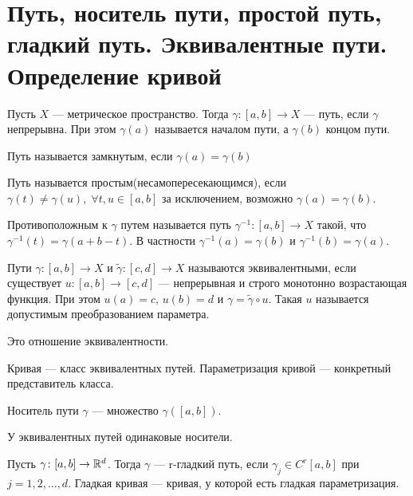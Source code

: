 \section{Путь, носитель пути, простой путь, гладкий путь. Эквивалентные пути. Определение кривой}

\begin{conj}
    Пусть $X$ --- метрическое пространство. Тогда
    $\gamma\colon [a, b] \to X$ --- путь, если $\gamma$ непрерывна. При этом $\gamma(a)$ называется началом пути, а $\gamma(b)$ концом пути.
  \end{conj}
  
  \begin{conj}
    Путь называется замкнутым, если $\gamma(a) = \gamma(b)$
  \end{conj}
  
  \begin{conj}
    Путь называется простым(несамопересекающимся), если  $\gamma(t) \neq \gamma(u),\; \forall t, u \in [a, b]$ за исключением, возможно $\gamma(a) = \gamma(b)$.
  \end{conj}
  
  \begin{conj}
    Противоположным к $\gamma$ путем называется путь $\gamma^{-1}\colon [a, b] \to X$ такой, что $\gamma^{-1}(t) = \gamma(a + b - t)$. В частности $\gamma^{-1}(a) = \gamma(b)$ и $\gamma^{-1}(b) = \gamma(a)$.
  \end{conj}
  
  \begin{conj}
    Пути $\gamma\colon[a, b] \to X$ и $\widetilde{\gamma}\colon[c, d] \to X$ называются эквивалентными, если существует $u\colon [a, b] \to [c, d]$ --- непрерывная и строго монотонно возрастающая функция. При этом $u(a) = c,\, u(b) = d$ и $\gamma = \widetilde{\gamma} \circ u$.
    Такая $u$ называется допустимым преобразованием параметра.
  \end{conj}
  
  \begin{notice}
    Это отношение эквивалентности.
  \end{notice}
  
  \begin{conj}
    Кривая --- класс эквивалентных путей. Параметризация кривой --- конкретный представитель класса.
  \end{conj}
  
  \begin{conj}
    Носитель пути $\gamma$ --- множество $\gamma([a, b])$.
  \end{conj}
  
  \begin{notice}
    У эквивалентных путей одинаковые носители.
  \end{notice}
  
  \begin{conj}
    Пусть $\gamma\colon [a, b] \to \mathbb{R}^d$. Тогда $\gamma$ --- r-гладкий путь, если $\gamma_j \in C^r[a, b]$ при $j = 1, 2, \dotsc, d$.
    Гладкая кривая --- кривая, у которой есть гладкая параметризация.
  \end{conj}
  